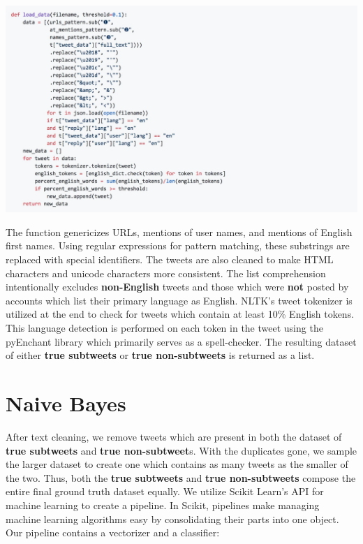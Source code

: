 \documentclass[11pt, twoside, reqno]{book}
\begin{document}
\includegraphics[width=\textwidth]{load_data}

The function genericizes URLs, mentions of user names, and mentions of English first names. Using regular expressions for pattern matching, these substrings are replaced with special identifiers. The tweets are also cleaned to make HTML characters and unicode characters more consistent. The list comprehension intentionally excludes \textbf{non-English} tweets and those which were \textbf{not} posted by accounts which list their primary language as English. NLTK's tweet tokenizer is utilized at the end to check for tweets which contain at least 10\% English tokens. This language detection is performed on each token in the tweet using the pyEnchant library \cite{pyenchant} which primarily serves as a spell-checker. The resulting dataset of either \textbf{true subtweets} or \textbf{true non-subtweets} is returned as a list.

\section{Naive Bayes}
\label{training_naive_bayes}

After text cleaning, we remove tweets which are present in both the dataset of \textbf{true subtweets} and \textbf{true non-subtweet}s. With the duplicates gone, we sample the larger dataset to create one which contains as many tweets as the smaller of the two. Thus, both the \textbf{true subtweets} and \textbf{true non-subtweets} compose the entire final ground truth dataset equally. We utilize Scikit Learn's API for machine learning \cite{scikit} to create a pipeline. In Scikit, pipelines make managing machine learning algorithms easy by consolidating their parts into one object. Our pipeline contains a vectorizer and a classifier:
\end{document}
